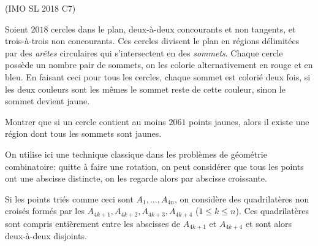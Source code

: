 \begin{exo}
(IMO SL 2018 C7)

Soient $2018$ cercles dans le plan, deux-à-deux concourants et non tangents, et trois-à-trois non concourants. Ces cercles divisent le plan en régions délimitées par des \textit{arêtes} circulaires qui s'intersectent en des \textit{sommets}. Chaque cercle possède un nombre pair de sommets, on les colorie alternativement en rouge et en bleu. En faisant ceci pour tous les cercles, chaque sommet est colorié deux fois, si les deux couleurs sont les mêmes le sommet reste de cette couleur, sinon le sommet devient jaune.

Montrer que si un cercle contient au moins $2061$ points jaunes, alors il existe une région dont tous les sommets sont jaunes.
\end{exo}

\begin{sol}
On utilise ici une technique classique dans les problèmes de géométrie combinatoire: quitte à faire une rotation, on peut considérer que tous les points ont une abscisse distincte, on les regarde alors par abscisse croissante.

Si les points triés comme ceci sont $A_1,\ldots,A_{4n}$, on considère des quadrilatères non croisés formés par les $A_{4k+1},A_{4k+2},A_{4k+3},A_{4k+4}$ ($1\le k\le n$). Ces quadrilatères sont compris entièrement entre les abscisses de $A_{4k+1}$ et $A_{4k+4}$ et sont alors deux-à-deux disjoints.
\end{sol}

